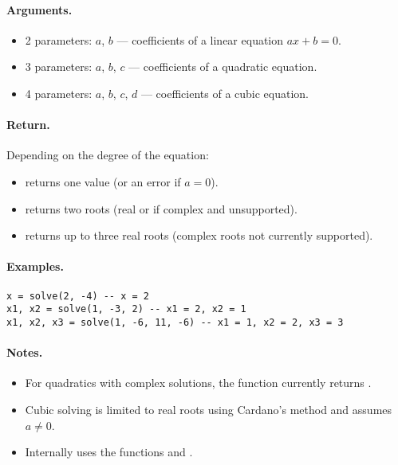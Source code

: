\paragraph{Arguments.}
\begin{itemize}
\item 2 parameters: $a$, $b$ — coefficients of a linear equation $ax + b = 0$.
\item 3 parameters: $a$, $b$, $c$ — coefficients of a quadratic equation.
\item 4 parameters: $a$, $b$, $c$, $d$ — coefficients of a cubic equation.
\end{itemize}

\paragraph{Return.}
Depending on the degree of the equation:
\begin{itemize}
\item {} returns one value (or an error if $a = 0$).
\item {} returns two roots (real or  if complex and unsupported).
\item {} returns up to three real roots (complex roots not currently supported).
\end{itemize}

\paragraph{Examples.}
\begin{verbatim}
x = solve(2, -4) -- x = 2
x1, x2 = solve(1, -3, 2) -- x1 = 2, x2 = 1
x1, x2, x3 = solve(1, -6, 11, -6) -- x1 = 1, x2 = 2, x3 = 3
\end{verbatim}

\paragraph{Notes.}
\begin{itemize}
\item For quadratics with complex solutions, the function currently returns .
\item Cubic solving is limited to real roots using Cardano's method and assumes $a \ne 0$.
\item Internally uses the functions  and .
\end{itemize}

